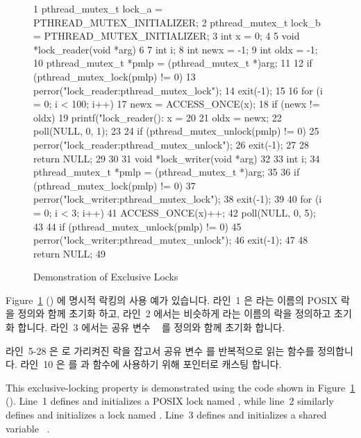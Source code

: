 \begin{figure}[tbp]
{ \scriptsize
\begin{verbbox}
  1 pthread_mutex_t lock_a = PTHREAD_MUTEX_INITIALIZER;
  2 pthread_mutex_t lock_b = PTHREAD_MUTEX_INITIALIZER;
  3 int x = 0;
  4 
  5 void *lock_reader(void *arg)
  6 {
  7   int i;
  8   int newx = -1;
  9   int oldx = -1;
 10   pthread_mutex_t *pmlp = (pthread_mutex_t *)arg;
 11 
 12   if (pthread_mutex_lock(pmlp) != 0) {
 13     perror("lock_reader:pthread_mutex_lock");
 14     exit(-1);
 15   }
 16   for (i = 0; i < 100; i++) {
 17     newx = ACCESS_ONCE(x);
 18     if (newx != oldx) {
 19       printf("lock_reader(): x = %
 20     }
 21     oldx = newx;
 22     poll(NULL, 0, 1);
 23   }
 24   if (pthread_mutex_unlock(pmlp) != 0) {
 25     perror("lock_reader:pthread_mutex_unlock");
 26     exit(-1);
 27   }
 28   return NULL;
 29 }
 30 
 31 void *lock_writer(void *arg)
 32 {
 33   int i;
 34   pthread_mutex_t *pmlp = (pthread_mutex_t *)arg;
 35 
 36   if (pthread_mutex_lock(pmlp) != 0) {
 37     perror("lock_writer:pthread_mutex_lock");
 38     exit(-1);
 39   }
 40   for (i = 0; i < 3; i++) {
 41     ACCESS_ONCE(x)++;
 42     poll(NULL, 0, 5);
 43   }
 44   if (pthread_mutex_unlock(pmlp) != 0) {
 45     perror("lock_writer:pthread_mutex_unlock");
 46     exit(-1);
 47   }
 48   return NULL;
 49 }
\end{verbbox}
}
\centering
\theverbbox
\caption{Demonstration of Exclusive Locks}
\label{fig:toolsoftrade:Demonstration of Exclusive Locks}
\end{figure}

Figure~\ref{fig:toolsoftrade:Demonstration of Exclusive Locks}
() 에 명시적 락킹의 사용 예가 있습니다.
라인~1 은  라는 이름의 POSIX 락을 정의와 함께 초기화 하고,
라인~2 에서는 비슷하게  라는 이름의 락을 정의하고 초기화 합니다.
라인~3 에서는 공유 변수 ~ 를 정의와 함께 초기화 합니다.

라인~5-28 은  로 가리켜진 락을 잡고서 공유 변수  를 반복적으로
읽는  함수를 정의합니다.
라인~10 은  를  과 
함수에 사용하기 위해  포인터로 캐스팅 합니다.

\iffalse
This exclusive-locking property is demonstrated using the code shown in
Figure~\ref{fig:toolsoftrade:Demonstration of Exclusive Locks}
().
Line~1 defines and initializes a POSIX lock named , while
line~2 similarly defines and initializes a lock named .
Line~3 defines and initializes a shared variable ~.

